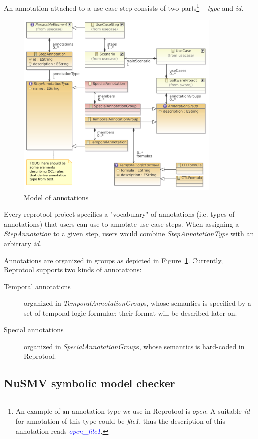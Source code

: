 An annotation attached to a use-case step consists of two parts\footnote{An example of an annotation type we use in Reprotool is \emph{open}.
A suitable \emph{id} for annotation of this type could be \emph{file1}, thus the description of this annotation reads \textcolor{Blue}{\emph{open\_file1}}.}
-- \emph{type} and \emph{id}.

\begin{figure}[ht]
  \centering
  \includegraphics[width=280pt]{images/ReprotoolUCAnnotModel}
  \caption{Model of annotations}
  \label{fig:ModelOfAnnotations}
\end{figure}

Every reprotool project specifies a "vocabulary" of annotations (i.e. types of annotations) that users can use to annotate use-case steps. When assigning a \emph{StepAnnotation} to a given step, users would combine \emph{StepAnnotationType} with an arbitrary \emph{id}.

Annotations are organized in groups as depicted in Figure~\ref{fig:ModelOfAnnotations}. Currently, Reprotool supports two kinds of annotations:
\begin{description}

	\item[Temporal annotations] organized in \emph{TemporalAnnotationGroup}s, whose semantics is specified by a set of temporal logic formulae; their format will be described later on.
	
	\item[Special annotations] organized in \emph{SpecialAnnotationGroup}s, whose semantics is hard-coded in Reprotool.
\end{description}


\subsection{NuSMV symbolic model checker}

